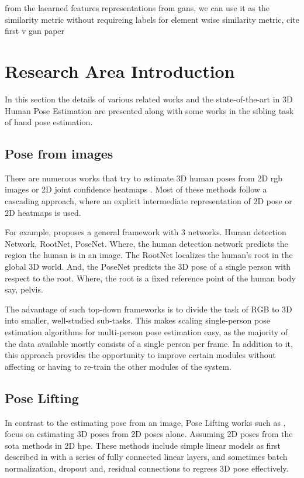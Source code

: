 from the laearned features representations from gans, we can use it as the similarity metric without requireing labels for element wsise similarity metric, cite first v gan paper \cite{autoencoding_beyond_pixels}

\lipsum[1-4] %

\section{Research Area Introduction}
\label{sec:Research area introduction}

In this section the details of various related works and the state-of-the-art in 3D Human Pose Estimation are presented along with some works in the sibling task of hand pose estimation.

\subsection{Pose from images}
There are numerous works that try to estimate 3D human poses from 2D \ac{rgb} images or 2D joint confidence heatmaps \cite{CameraDistanceAware, poselifter, DistillNRSfM, occlusionVideo}. Most of these methods follow a cascading approach, where an explicit intermediate representation of 2D pose or 2D heatmaps is used.

For example, \cite{CameraDistanceAware} proposes a general framework with 3 networks. Human detection Network, RootNet, PoseNet. Where, the human detection network predicts the region the human is in an image. The RootNet localizes the human's root in the global 3D world. And, the PoseNet predicts the 3D pose of a single person with respect to the root. Where, the root is a fixed reference point of the human body say, pelvis.

The advantage of such top-down frameworks is to divide the task of RGB to 3D into smaller, well-studied sub-tasks. This makes scaling single-person pose estimation algorithms for multi-person pose estimation easy, as the majority of the data available mostly consists of a single person per frame. In addition to it, this approach provides the opportunity to improve certain modules without affecting or having to re-train the other modules of the system.

\subsection{Pose Lifting}

In contrast to the estimating pose from an image, Pose Lifting works such as \cite{poselifter,  amazon1, repnet, c3dpo, unsupervisedAdversarial}, focus on estimating 3D poses from 2D poses alone. Assuming 2D poses from the \ac{sota} methods in 2D \ac{hpe}. These methods include simple linear models as first described in \cite{MartinezHRL17} with a series of fully connected linear layers, and sometimes batch normalization, dropout and, residual connections to regress 3D pose effectively.

